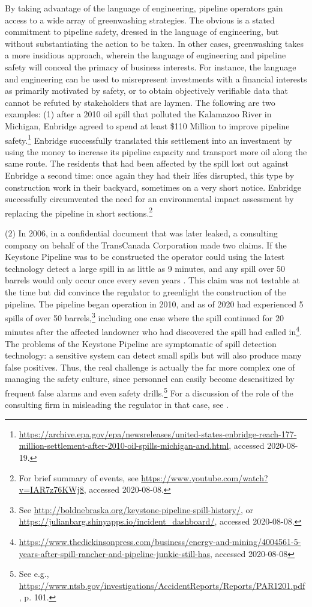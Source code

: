 By taking advantage of the language of engineering, pipeline operators gain access to a wide array of greenwashing strategies. The obvious is a stated commitment to pipeline safety, dressed in the language of engineering, but without substantiating the action to be taken. In other cases, greenwashing takes a more insidious approach, wherein the language of engineering and pipeline safety will conceal the primacy of business interests. For instance, the language and engineering can be used to misrepresent investments with a financial interests as primarily motivated by safety, or to obtain objectively verifiable data that cannot be refuted by stakeholders that are laymen. The following are two examples: (1) after a 2010 oil spill that polluted the Kalamazoo River in Michigan, Enbridge agreed to spend at least \$110 Million to improve pipeline safety.\footnote{\url{https://archive.epa.gov/epa/newsreleases/united-states-enbridge-reach-177-million-settlement-after-2010-oil-spills-michigan-and.html}, accessed 2020-08-19.} Enbridge successfully translated this settlement into an investment by using the money to increase its pipeline capacity and transport more oil along the same route. The residents that had been affected by the spill lost out against Enbridge a second time: once again they had their lifes disrupted, this type by construction work in their backyard, sometimes on a very short notice. Enbridge successfully circumvented the need for an environmental impact assessment by replacing the pipeline in short sections.\footnote{For brief summary of events, see \url{https://www.youtube.com/watch?v=IAR7z76KWj8}, accessed 2020-08-08.}

(2) In 2006, in a confidential document that was later leaked, a consulting company on behalf of the TransCanada Corporation made two claims. If the Keystone Pipeline was to be constructed the operator could using the latest technology detect a large spill in as little as 9 minutes, and any spill over 50 barrels would only occur once every seven years \citep{Consulting2006}. This claim was not testable at the time but did convince the regulator to greenlight the construction of the pipeline. The pipeline began operation in 2010, and as of 2020 had experienced 5 spills of over 50 barrels,\footnote{See \url{http://boldnebraska.org/keystone-pipeline-spill-history/}, or \url{https://julianbarg.shinyapps.io/incident_dashboard/}, accessed 2020-08-08.} including one case where the spill continued for 20 minutes after the affected landowner who had discovered the spill had called in\footnote{\url{https://www.thedickinsonpress.com/business/energy-and-mining/4004561-5-years-after-spill-rancher-and-pipeline-junkie-still-has}, accessed 2020-08-08}. The problems of the Keystone Pipeline are symptomatic of spill detection technology: a sensitive system can detect small spills but will also produce many false positives. Thus, the real challenge is actually the far more complex one of managing the safety culture, since personnel can easily become desensitized by frequent false alarms and even safety drills.\footnote{See e.g., \url{https://www.ntsb.gov/investigations/AccidentReports/Reports/PAR1201.pdf}, p. 101.} For a discussion of the role of the consulting firm in misleading the regulator in that case, see \citet{Stansbury2011}.

